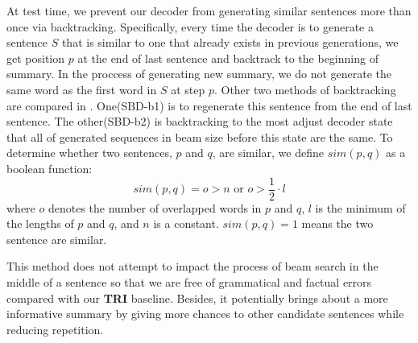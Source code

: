 At test time, we prevent our decoder from generating similar sentences more 
than once via backtracking. 
Specifically, every time the decoder is to generate a sentence $S$
that is similar to one that already exists in previous generations, 
we get position $p$ at the end of last sentence and backtrack to  
the beginning of summary.
In the proccess of generating new summary, 
we do not generate the same word as the first word in $S$ at step $p$.
Other two methods of backtracking are compared in .
One(SBD-b1) is to regenerate this sentence from the end of last sentence.
The other(SBD-b2) is backtracking to the most adjust decoder state 
that all of generated sequences in beam size
before this state are the same.
To determine whether two sentences, 
$p$ and $q$, are similar, we define $sim(p, q)$ as a boolean function:
\begin{equation}\label{eq:s}
    sim(p,q) = o > n\text{ or }o > \frac{1}{2}\cdot l
\end{equation}
where $o$ denotes the number of overlapped words in $p$ and $q$, 
$l$ is the minimum of the lengths of $p$ and $q$, and $n$ is a constant. 
$sim(p,q)=1$ means the two sentence are similar.

This method does not attempt to impact the process of beam search in the middle of a sentence so that we are free of grammatical and factual errors compared with our \textbf{TRI} baseline.
Besides, it potentially brings about a more informative summary by 
giving more chances to other candidate sentences while reducing repetition.
